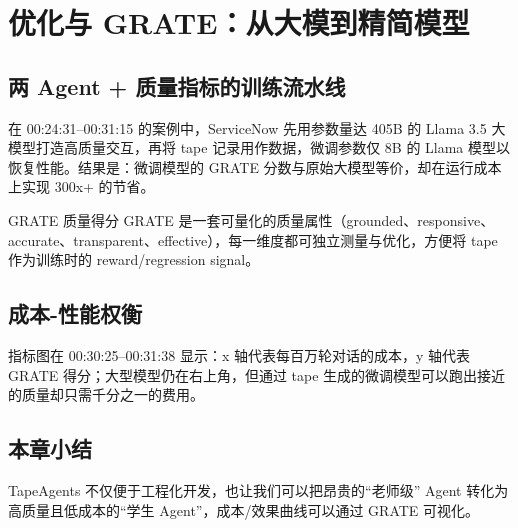 \section{优化与 GRATE：从大模到精简模型}
\subsection{两 Agent + 质量指标的训练流水线}
在 00:24:31--00:31:15 的案例中，ServiceNow 先用参数量达 405B 的 Llama 3.5 大模型打造高质量交互，再将 tape 记录用作数据，微调参数仅 8B 的 Llama 模型以恢复性能。结果是：微调模型的 GRATE 分数与原始大模型等价，却在运行成本上实现 300x+ 的节省。

\begin{knowledgebox}{GRATE 质量得分}
GRATE 是一套可量化的质量属性（grounded、responsive、accurate、transparent、effective），每一维度都可独立测量与优化，方便将 tape 作为训练时的 reward/regression signal。
\end{knowledgebox}

\subsection{成本-性能权衡}
指标图在 00:30:25--00:31:38 显示：x 轴代表每百万轮对话的成本，y 轴代表 GRATE 得分；大型模型仍在右上角，但通过 tape 生成的微调模型可以跑出接近的质量却只需千分之一的费用。

\subsection{本章小结}
TapeAgents 不仅便于工程化开发，也让我们可以把昂贵的“老师级” Agent 转化为高质量且低成本的“学生 Agent”，成本/效果曲线可以通过 GRATE 可视化。

